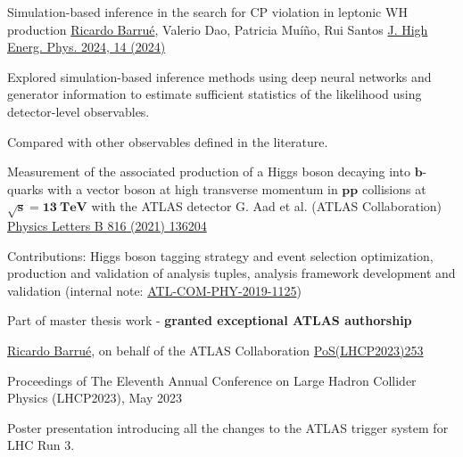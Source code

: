 


\begin{cventries}

    \cventry
    {Simulation-based inference in the search for CP violation in leptonic WH production}
    {\underline{Ricardo Barrué}, Valerio Dao, Patricia Muíño, Rui Santos}
    {}
    {\href{https://doi.org/10.1007/JHEP04(2024)014}{J. High Energ. Phys. 2024, 14 (2024)}}
    {
        \begin{cvitems}
        \item {Explored simulation-based inference methods using deep neural networks and generator information to estimate sufficient statistics of the likelihood using detector-level observables.}
        \item {Compared with other observables defined in the literature.}
        \end{cvitems}
    }%

    \cventry
    {Measurement of the associated production of a Higgs boson decaying into $\mathbf{b}$-quarks with a vector boson at high transverse momentum in $\mathbf{pp}$ collisions at $\mathbf{\sqrt{s}= 13 \:\text{TeV}}$ with the ATLAS detector}
    {G. Aad et al. (ATLAS Collaboration)}
    {}
    {\href{https://doi.org/10.1016/j.physletb.2021.136204}{Physics Letters B 816 (2021) 136204}}
    {
        \begin{cvitems}
            \item {Contributions: Higgs boson tagging strategy and event selection optimization, production and validation of analysis tuples, analysis framework development and validation (internal note: \href{https://cds.cern.ch/record/2688371}{ATL-COM-PHY-2019-1125})}
            \item {Part of master thesis work - \textbf{granted exceptional ATLAS authorship}}
        \end{cvitems}
    }
    
\end{cventries}


\begin{cventries}
    {\underline{Ricardo Barrué}, on behalf of the ATLAS Collaboration}{}
    {\href{https://pos.sissa.it/450/253/}{PoS(LHCP2023)253}}
    {
        \begin{cvitems}
            \item {Proceedings of The Eleventh Annual Conference on Large Hadron Collider Physics (LHCP2023), May 2023}
            \item {Poster presentation introducing all the changes to the ATLAS trigger system for LHC Run 3.}
        \end{cvitems}
    }
\end{cventries}


